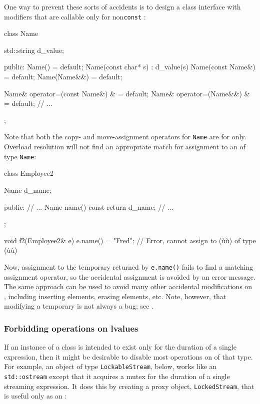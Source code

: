 One way to prevent these sorts of accidents is to design a class
interface with  modifiers that are callable only
for non\lstinline!const! :

\begin{emcppslisting}[emcppsbatch=e4]
class Name
{
    std::string d_value;

public:
    Name() = default;
    Name(const char* s) : d_value(s) {}
    Name(const Name&) = default;
    Name(Name&&) = default;

    Name& operator=(const Name&) & = default;
    Name& operator=(Name&&) &      = default;
    // ...
};
\end{emcppslisting}
    

\noindent Note that both the copy- and move-assignment operators for \lstinline!Name!
are  for  only. Overload resolution
will not find an appropriate match for assignment to an  of
type \lstinline!Name!:

\begin{emcppslisting}[emcppsbatch=e4]
class Employee2
{
    Name d_name;

public:
    // ...
    Name name() const { return d_name; }
    // ...
};

void f2(Employee2& e)
{
    e.name() = "Fred";  // Error, cannot assign to (ù{}ù) of type (ù{}ù)
}
\end{emcppslisting}
    

\noindent Now, assignment to the temporary returned by \lstinline!e.name()! fails to
find a matching assignment operator, so the accidental assignment is
avoided by an error message. The same approach can be used to avoid many
other accidental modifications on , including inserting
elements, erasing elements, etc. Note, however, that modifying a
temporary is not always a bug; see .

\subsubsection[Forbidding operations on \romeovalue{lvalues}]{Forbidding operations on {\sfbsubsubsecitalRomeo lvalues}}\label{forbidding-operations-on-lvalues}

If an instance of a class is intended to exist only for the duration of
a single expression, then it might be desirable to disable most
operations on  of that type. For example, an object of
type \lstinline!LockableStream!, below, works like an \lstinline!std::ostream!
except that it acquires a mutex for the duration of a single streaming
expression. It does this by creating a proxy object,
\lstinline!LockedStream!, that is useful only as an :

